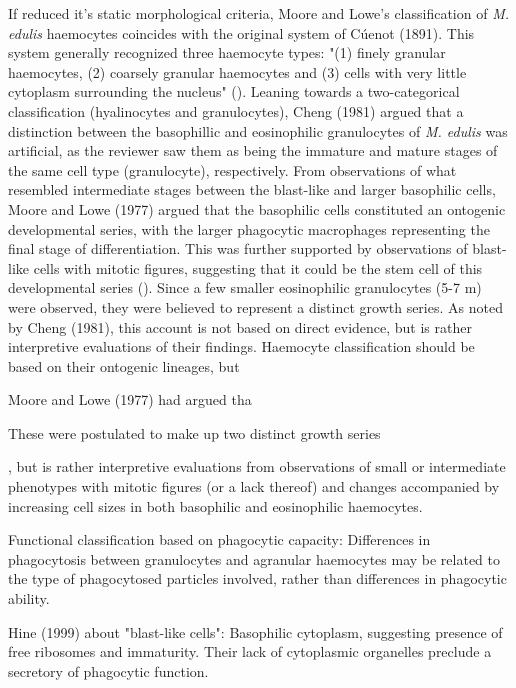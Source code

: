 If reduced it's static morphological criteria, Moore and Lowe's classification of \emph{M. edulis} haemocytes coincides with the original system of Cúenot (1891). This system generally recognized three haemocyte types: "(1) finely granular haemocytes, (2) coarsely granular haemocytes and (3) cells with very little cytoplasm surrounding the nucleus" (\cite{Cheng1984}). Leaning towards a two-categorical classification (hyalinocytes and granulocytes), Cheng (1981) argued that a distinction between the basophillic and eosinophilic granulocytes of \emph{M. edulis} was artificial, as the reviewer saw them as being the immature and mature stages of the same cell type (granulocyte), respectively. From observations of what resembled intermediate stages between the blast-like and larger basophilic cells, Moore and Lowe (1977) argued that the basophilic cells constituted an ontogenic developmental series, with the larger phagocytic macrophages representing the final stage of differentiation. This was further supported by observations of blast-like cells with mitotic figures, suggesting that it could be the stem cell of this developmental series (\cite{Moore1977}). Since a few smaller eosinophilic granulocytes (5-7 \micro m) were observed, they were believed to represent a distinct growth series. As noted by Cheng (1981), this account is not based on direct evidence, but is rather interpretive evaluations of their findings. Haemocyte classification should be based on their ontogenic lineages, but 


Moore and Lowe (1977) had argued tha



These were postulated to make up two distinct growth series


, but is rather interpretive evaluations from observations of small or intermediate phenotypes with mitotic figures (or a lack thereof) and changes accompanied by increasing cell sizes in both basophilic and eosinophilic haemocytes.



Functional classification based on phagocytic capacity: Differences in phagocytosis between granulocytes and agranular haemocytes may be related to the type of phagocytosed particles involved, rather than differences in phagocytic ability.

Hine (1999) about "blast-like cells": Basophilic cytoplasm, suggesting presence of free ribosomes and immaturity. Their lack of cytoplasmic organelles preclude a secretory of phagocytic function.

